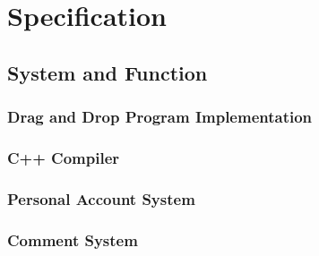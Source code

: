 \documentclass[CSCI3100_Documentation]{subfiles}
\begin{document}
  \chapter{Specification}
  \section{System and Function}
  \subsection{Drag and Drop Program Implementation}
  \subsection{C++ Compiler}
  \subsection{Personal Account System}
  \subsection{Comment System}
\end{document}
